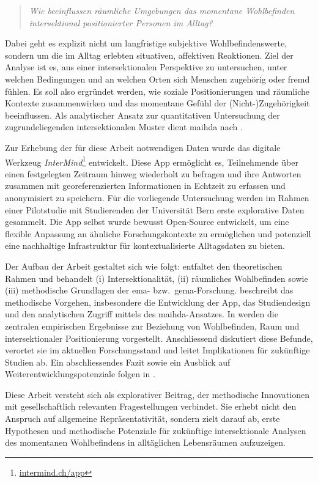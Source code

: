 \begin{quote}
\emph{Wie beeinflussen räumliche Umgebungen das momentane Wohlbefinden intersektional positionierter Personen im Alltag?}
\end{quote}

Dabei geht es explizit nicht um langfristige subjektive Wohlbefindenswerte, sondern um die im Alltag erlebten situativen, affektiven Reaktionen. Ziel der Analyse ist es, aus einer intersektionalen Perspektive zu untersuchen, unter welchen Bedingungen und an welchen Orten sich Menschen zugehörig oder fremd fühlen. Es soll also ergründet werden, wie soziale Positionierungen und räumliche Kontexte zusammenwirken und das momentane Gefühl der (Nicht-)Zugehörigkeit beeinflussen. Als analytischer Ansatz zur quantitativen Untersuchung der zugrundeliegenden intersektionalen Muster dient \gls{maihda} nach \textcite{grossModellingIntersectionalityQuantitative2023}.

Zur Erhebung der für diese Arbeit notwendigen Daten wurde das digitale Werkzeug \emph{InterMind}\footnote{\href{https://intermind.ch/app}{intermind.ch/app}} entwickelt. Diese App ermöglicht es, Teilnehmende über einen festgelegten Zeitraum hinweg wiederholt zu befragen und ihre Antworten zusammen mit georeferenzierten Informationen in Echtzeit zu erfassen und anonymisiert zu speichern. Für die vorliegende Untersuchung werden im Rahmen einer Pilotstudie mit Studierenden der Universität Bern erste explorative Daten gesammelt. Die App selbst wurde bewusst Open-Source entwickelt, um eine flexible Anpassung an ähnliche Forschungskontexte zu ermöglichen und potenziell eine nachhaltige Infrastruktur für kontextualisierte Alltagsdaten zu bieten.


Der Aufbau der Arbeit gestaltet sich wie folgt:  entfaltet den theoretischen Rahmen und behandelt (i) Intersektionalität, (ii) räumliches Wohlbefinden sowie (iii) methodische Grundlagen der \gls{ema}- bzw.\ \gls{gema}-Forschung.  beschreibt das methodische Vorgehen, insbesondere die Entwicklung der App, das Studiendesign und den analytischen Zugriff mittels des \gls{maihda}-Ansatzes. In  werden die zentralen empirischen Ergebnisse zur Beziehung von Wohlbefinden, Raum und intersektionaler Positionierung vorgestellt. Anschliessend diskutiert  diese Befunde, verortet sie im aktuellen Forschungsstand und leitet Implikationen für zukünftige Studien ab. Ein abschliessendes Fazit sowie ein Ausblick auf Weiterentwicklungspotenziale folgen in .


Diese Arbeit versteht sich als explorativer Beitrag, der methodische Innovationen mit gesellschaftlich relevanten Fragestellungen verbindet. Sie erhebt nicht den Anspruch auf allgemeine Repräsentativität, sondern zielt darauf ab, erste Hypothesen und methodische Potenziale für zukünftige intersektionale Analysen des momentanen Wohlbefindens in alltäglichen Lebensräumen aufzuzeigen.